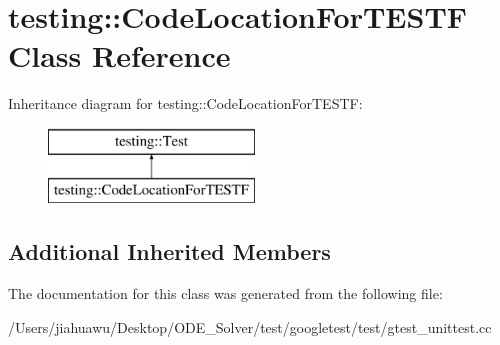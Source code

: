 \hypertarget{classtesting_1_1_code_location_for_t_e_s_t_f}{}\section{testing\+:\+:Code\+Location\+For\+T\+E\+S\+TF Class Reference}
\label{classtesting_1_1_code_location_for_t_e_s_t_f}
Inheritance diagram for testing\+:\+:Code\+Location\+For\+T\+E\+S\+TF\+:\begin{figure}[H]
\begin{center}
\leavevmode
\includegraphics[height=2.000000cm]{classtesting_1_1_code_location_for_t_e_s_t_f}
\end{center}
\end{figure}
\subsection*{Additional Inherited Members}


The documentation for this class was generated from the following file\+:\begin{DoxyCompactItemize}
\item 
/\+Users/jiahuawu/\+Desktop/\+O\+D\+E\+\_\+\+Solver/test/googletest/test/gtest\+\_\+unittest.\+cc\end{DoxyCompactItemize}
